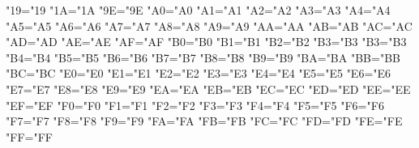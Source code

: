 \lccode"19="19 %
\lccode"1A="1A %
\lccode"9E="9E %
\lccode"A0="A0 %
\lccode"A1="A1 %
\lccode"A2="A2 %
\lccode"A3="A3 %
\lccode"A4="A4 %
\lccode"A5="A5 %
\lccode"A6="A6 %
\lccode"A7="A7 %
\lccode"A8="A8 %
\lccode"A9="A9 %
\lccode"AA="AA %
\lccode"AB="AB %
\lccode"AC="AC %
\lccode"AD="AD %
\lccode"AE="AE %
\lccode"AF="AF %
\lccode"B0="B0 %
\lccode"B1="B1 %
\lccode"B2="B2 %
\lccode"B3="B3 %
\lccode"B3="B3 %
\lccode"B4="B4 %
\lccode"B5="B5 %
\lccode"B6="B6 %
\lccode"B7="B7 %
\lccode"B8="B8 %
\lccode"B9="B9 %
\lccode"BA="BA %
\lccode"BB="BB %
\lccode"BC="BC %
\lccode"E0="E0 %
\lccode"E1="E1 %
\lccode"E2="E2 %
\lccode"E3="E3 %
\lccode"E4="E4 %
\lccode"E5="E5 %
\lccode"E6="E6 %
\lccode"E7="E7 %
\lccode"E8="E8 %
\lccode"E9="E9 %
\lccode"EA="EA %
\lccode"EB="EB %
\lccode"EC="EC %
\lccode"ED="ED %
\lccode"EE="EE %
\lccode"EF="EF %
\lccode"F0="F0 %
\lccode"F1="F1 %
\lccode"F2="F2 %
\lccode"F3="F3 %
\lccode"F4="F4 %
\lccode"F5="F5 %
\lccode"F6="F6 %
\lccode"F7="F7 %
\lccode"F8="F8 %
\lccode"F9="F9 %
\lccode"FA="FA %
\lccode"FB="FB %
\lccode"FC="FC %
\lccode"FD="FD %
\lccode"FE="FE %
\lccode"FF="FF %

